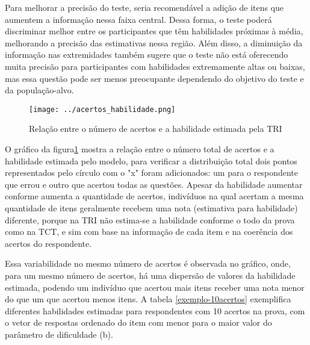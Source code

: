 Para melhorar a precisão do teste, seria recomendável a adição de itens que aumentem a informação nessa faixa central. Dessa forma, o teste poderá discriminar melhor entre os participantes que têm habilidades próximas à média, melhorando a precisão das estimativas nessa região. Além disso, a diminuição da informação nas extremidades também sugere que o teste não está oferecendo muita precisão para participantes com habilidades extremamente altas ou baixas, mas essa questão pode ser menos preocupante dependendo do objetivo do teste e da população-alvo.

\begin{figure}[!hbt]
	\centering
	\texttt{[image: ../acertos\_habilidade.png]}
	\caption{Relação entre o número de acertos e a habilidade estimada pela TRI}
	\label{fig:acertos_habilidade}
\end{figure}

O gráfico da figura\ref{fig:acertos_habilidade} mostra a relação entre o número total de acertos e a habilidade estimada pelo modelo, para verificar a distribuição total dois pontos representados pelo círculo com o "x" foram adicionados: um para o respondente que errou e outro que acertou todas as questões. Apesar da habilidade aumentar conforme aumenta a quantidade de acertos, indivíduos na qual acertam a mesma quantidade de itens geralmente recebem uma nota (estimativa para habilidade) diferente, porque na TRI não estima-se a habilidade conforme o todo da prova como na TCT, e sim com base na informação de cada item e na coerência dos acertos do respondente. 

Essa variabilidade no mesmo número de acertos é observada no gráfico, onde, para um mesmo número de acertos, há uma dispersão de valores da habilidade estimada, podendo um indivíduo que acertou mais itens receber uma nota menor do que um que acertou menos itens. A tabela \ref{exemplo-10acertos} exemplifica diferentes habilidades estimadas para respondentes com 10 acertos na prova, com o vetor de respostas ordenado do item com menor para o maior valor do parâmetro de dificuldade (b).


